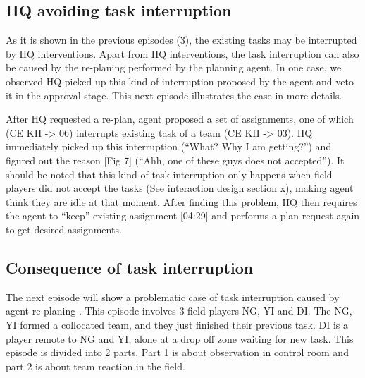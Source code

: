 \subsection{HQ avoiding task interruption}
As it is shown in the previous episodes (3), the existing tasks may be interrupted by HQ interventions. Apart from HQ interventions, the task interruption can also be caused by the re-planing performed by the planning agent. In one case, we observed HQ picked up this kind of interruption proposed by the agent and veto it in the approval stage. This next episode illustrates the case in more details. \\

\noindent{} 


After HQ requested a re-plan, agent proposed a set of assignments, one of which (CE KH -> 06) interrupts existing task of a team (CE KH -> 03). HQ immediately picked up this interruption (``What? Why I am getting?'') and figured out the reason [Fig 7] (``Ahh, one of these guys does not accepted''). It should be noted that this kind of task interruption only happens when field players did not accept the tasks (See interaction design section x), making agent think they are idle at that moment. After finding this problem, HQ then requires the agent to ``keep'' existing assignment [04:29] and performs a plan request again to get desired assignments. \\


\subsection{Consequence of task interruption}\label{sec:study3taskinterruption}
The next episode will show a problematic case of task interruption caused by agent re-planing . This episode involves 3 field players NG, YI and DI. The NG, YI formed a collocated team, and they just finished their previous task. DI is a player remote to NG and YI, alone at a drop off zone waiting for new task. This episode is divided into 2 parts. Part 1 is about observation in control room and part 2 is about team reaction in the field.\\

